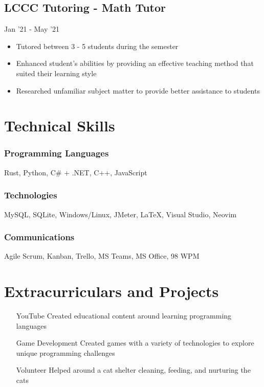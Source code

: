 \documentclass{article}
\begin{document}
\subsection{LCCC Tutoring - Math Tutor} Jan '21 - May '21
\begin{itemize}
  \item Tutored between 3 - 5 students during the semester
  \item Enhanced student’s abilities by providing an effective teaching method that suited their learning style
  \item Researched unfamiliar subject matter to provide better assistance to students
\end{itemize}

\section{Technical Skills}

\subsubsection{Programming Languages} Rust, Python, C\# + .NET, C++, JavaScript

\subsubsection{Technologies} MySQL, SQLite, Windows/Linux, JMeter, {\LaTeX}, Visual Studio, Neovim

\subsubsection{Communications} Agile Scrum, Kanban, Trello, MS Teams, MS Office, 98 WPM

\section{Extracurriculars and Projects}
\begin{itemize}
  \item[YouTube] Created educational content around learning programming languages
  \item[Game Development] Created games with a variety of technologies to explore unique programming challenges
  \item[Volunteer] Helped around a cat shelter cleaning, feeding, and nurturing the cats
\end{itemize}
\end{document}
